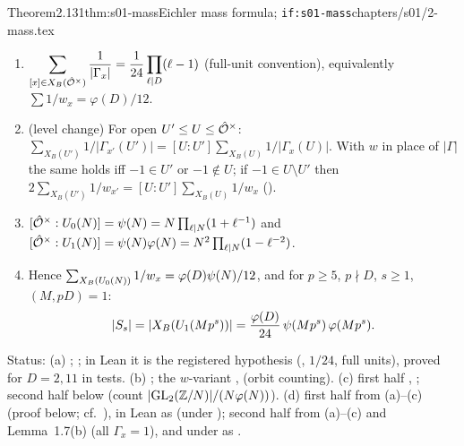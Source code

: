 \begin{quoted}{Theorem}{2.1}{31}{thm:s01-mass}{Eichler mass formula; \texttt{if:s01-mass}}{chapters/s01/2-mass.tex}\label{rpt:thm:s01-mass}
\begin{enumerate}[label=(\alph*)]
\item $\displaystyle\sum_{[x]\in X_B(\hat{\mathcal{O}}^\times)}\frac1{|\Gamma_x|}=\frac{1}{24}\prod_{\ell\mid D}(\ell-1)$
  (full-unit convention), equivalently $\sum 1/w_x=\varphi(D)/12$.
\item (level change) For open $U'\le U\le\hat{\mathcal{O}}^\times$: $\sum_{X_B(U')}1/|\Gamma_{x'}(U')|=[U:U']\sum_{X_B(U)}1/|\Gamma_x(U)|$.
  With $w$ in place of $|\Gamma|$ the same holds iff $-1\in U'$ or $-1\notin U$; if $-1\in U\setminus U'$ then
  $2\sum_{X_B(U')}1/w_{x'}=[U:U']\sum_{X_B(U)}1/w_x$ ().
\item $[\hat{\mathcal{O}}^\times:U_0(N)]=\psi(N)=N\prod_{\ell\mid N}(1+\ell^{-1})$ and $[\hat{\mathcal{O}}^\times:U_1(N)]=\psi(N)\varphi(N)=N^2\prod_{\ell\mid N}(1-\ell^{-2})$.
\item Hence $\sum_{X_B(U_0(N))}1/w_x=\varphi(D)\psi(N)/12$, and for $p\ge5$, $p\nmid D$, $s\ge1$, $(M,pD)=1$:
\[|S_s|=|X_B(U_1(Mp^s))|=\frac{\varphi(D)}{24}\,\psi(Mp^s)\,\varphi(Mp^s).\]
\end{enumerate}
Status: (a) \stcited{} \cite[Thm.~25.1.1, p.~415 (with $w_J=\#\cO_L(J)^\times/\{\pm1\}$,
hence $1/12$)]{Vo}; \cite[\S4 ``Klassenzahl und Maß'', p.~136ff.]{Eic55};
in Lean it is the registered hypothesis  (, $1/24$, full units), proved
for $D=2,11$ in tests. (b) \stformal{}  ; the $w$-variant \stformal{} ,
 (orbit counting). (c) first half \stformal{} , ; second half
\stproved{} below (count $|\mathrm{GL}_2(\mathbb{Z}/N)|/(N\varphi(N))$). (d) first half \stpmc{} from (a)--(c) (proof below; cf.\ \cite[Thm.~25.3.18,
p.~423]{Vo}), \stpmc{} in Lean as  (under ); second half \stpmc{} from (a)--(c)
and Lemma~1.7(b) (all $\Gamma_x=1$), and \stformal{} under  as .
\end{quoted}
